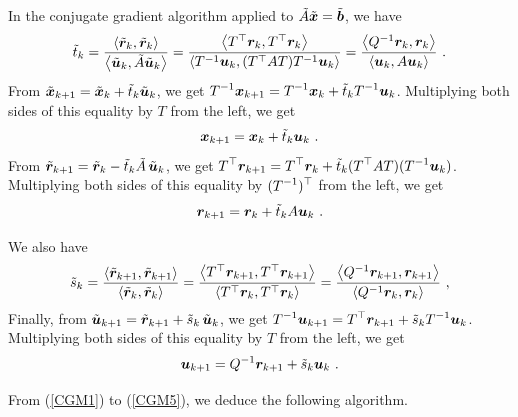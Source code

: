 In the conjugate gradient algorithm applied to
$\tilde{A} \tilde{\bm{x}} = \tilde{\bm{b}}$, we have
\begin{equation} \label{CGM1}
\tilde{t}_k =
\frac{\left\langle{\tilde{\bm{r}}_k} , {\tilde{\bm{r}}_k}\right\rangle}
{\left\langle{\tilde{\bm{u}}_k} , {\tilde{A} \tilde{\bm{u}}_k}\right\rangle}
= \frac{\left\langle{T^\top\bm{r}_k} , {T^\top\bm{r}_k}\right\rangle}
{\left\langle{T^{-1}\bm{u}_k} , {(T^\top A T)T^{-1}\bm{u}_k}\right\rangle}
= \frac{\left\langle{Q^{-1}\bm{r}_k} , {\bm{r}_k}\right\rangle}
{\left\langle{\bm{u}_k} , {A\bm{u}_k}\right\rangle} \ .
\end{equation}
From
$\tilde{\bm{x}}_{k+1} = \tilde{\bm{x}}_k + \tilde{t}_k \tilde{\bm{u}}_k$, we get
$\displaystyle T^{-1}\bm{x}_{k+1} = T^{-1}\bm{x}_k + \tilde{t}_k
T^{-1} \bm{u}_k$.
Multiplying both sides of this equality by $T$ from the left,
we get
\begin{equation} \label{CGM2}
\bm{x}_{k+1} = \bm{x}_k + \tilde{t}_k \bm{u}_k \ .
\end{equation}
From 
$\tilde{\bm{r}}_{k+1} = \tilde{\bm{r}}_k - \tilde{t}_k \tilde{A} \, \tilde{\bm{u}}_k$,
we get
$\displaystyle T^\top\bm{r}_{k+1} = T^\top\bm{r}_k
+ \tilde{t}_k (T^\top A T)(T^{-1} \bm{u}_k)$.  Multiplying both sides of
this equality by $\displaystyle (T^{-1})^\top$ from the left, we get
\begin{equation} \label{CGM3}
\bm{r}_{k+1} = \bm{r}_k + \tilde{t}_k A \bm{u}_k \ .
\end{equation}

We also have
\begin{equation} \label{CGM4}
\tilde{s}_k =
\frac{\left\langle{\tilde{\bm{r}}_{k+1}} , {\tilde{\bm{r}}_{k+1}}\right\rangle}
{\left\langle{\tilde{\bm{r}}_k} , {\tilde{\bm{r}}_k}\right\rangle}
= \frac{\left\langle{T^\top\bm{r}_{k+1}} , {T^\top\bm{r}_{k+1}}\right\rangle}
{\left\langle{T^\top\bm{r}_k} , {T^\top \bm{r}_k}\right\rangle}
= \frac{\left\langle{Q^{-1}\bm{r}_{k+1}} , {\bm{r}_{k+1}}\right\rangle}
{\left\langle{Q^{-1}\bm{r}_k} , {\bm{r}_k}\right\rangle} \ ,
\end{equation}
Finally, from
$\tilde{\bm{u}}_{k+1} = \tilde{\bm{r}}_{k+1} + \tilde{s}_k \, \tilde{\bm{u}}_k$, we get
$\displaystyle T^{-1}\bm{u}_{k+1} = T^\top \bm{r}_{k+1} +
\tilde{s}_k T^{-1} \bm{u}_k$.
Multiplying both sides of this equality by $T$ from the left,
we get
\begin{equation} \label{CGM5}
\VEC{u}_{k+1} = Q^{-1} \VEC{r}_{k+1} + \tilde{s}_k \VEC{u}_k \ .
\end{equation}

From (\ref{CGM1}) to (\ref{CGM5}), we deduce the following
algorithm.

